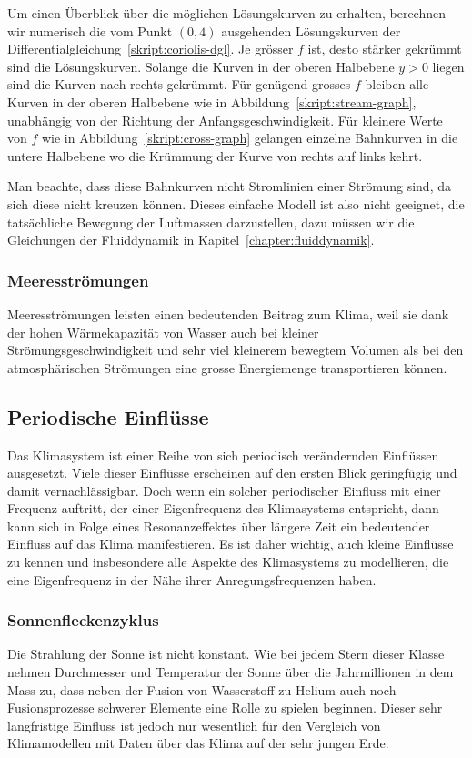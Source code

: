 Um einen Überblick über die möglichen Lösungskurven zu erhalten, berechnen
wir numerisch die vom Punkt $(0,4)$ ausgehenden Lösungskurven 
der Differentialgleichung~\ref{skript:coriolis-dgl}.
Je grösser $f$ ist, desto stärker gekrümmt sind die Lösungskurven.
Solange die Kurven in der oberen Halbebene $y>0$ liegen sind die Kurven
nach rechts gekrümmt.
Für genügend grosses $f$ bleiben alle Kurven in der oberen
Halbebene wie in Abbildung~\ref{skript:stream-graph}, unabhängig
von der Richtung der Anfangsgeschwindigkeit.
Für kleinere Werte von $f$ wie in Abbildung~\ref{skript:cross-graph}
gelangen einzelne Bahnkurven in die untere Halbebene wo die Krümmung
der Kurve von rechts auf links kehrt.

Man beachte, dass diese Bahnkurven nicht Stromlinien einer Strömung sind,
da sich diese nicht kreuzen können.
Dieses einfache Modell ist also nicht geeignet, die tatsächliche Bewegung
der Luftmassen darzustellen, dazu müssen wir die Gleichungen
der Fluiddynamik in Kapitel~\ref{chapter:fluiddynamik}.

\subsubsection{Meeresströmungen}
Meeresströmungen leisten einen bedeutenden Beitrag zum Klima, weil sie
dank der hohen Wärmekapazität von Wasser auch bei kleiner
Strömungsgeschwindigkeit und sehr viel kleinerem bewegtem Volumen als
bei den atmosphärischen Strömungen eine grosse Energiemenge transportieren
können.

\subsection{Periodische Einflüsse}
Das Klimasystem ist einer Reihe von sich periodisch verändernden 
Einflüssen ausgesetzt.
Viele dieser Einflüsse erscheinen auf den ersten Blick geringfügig
und damit vernachlässigbar.
Doch wenn ein solcher periodischer Einfluss mit einer Frequenz auftritt,
der einer Eigenfrequenz des Klimasystems entspricht, dann kann sich 
in Folge eines Resonanzeffektes über längere Zeit ein bedeutender 
Einfluss auf das Klima manifestieren.
Es ist daher wichtig, auch kleine Einflüsse zu kennen und insbesondere
alle Aspekte des Klimasystems zu modellieren, die eine Eigenfrequenz
in der Nähe ihrer Anregungsfrequenzen haben.

\subsubsection{Sonnenfleckenzyklus}
%
%
Die Strahlung der Sonne ist nicht konstant.
Wie bei jedem Stern dieser Klasse nehmen Durchmesser und Temperatur der
Sonne über die Jahrmillionen in dem Mass zu, dass neben der Fusion
von Wasserstoff zu Helium auch noch Fusionsprozesse schwerer Elemente
eine Rolle zu spielen beginnen.
Dieser sehr langfristige Einfluss ist jedoch nur wesentlich für
den Vergleich von Klimamodellen mit Daten über das Klima auf der sehr
jungen Erde.

